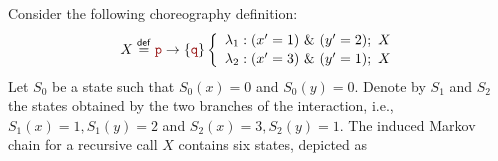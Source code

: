 \begin{example}\label{example2}
  Consider the following choreography definition:
  \begin{displaymath}
    \begin{array}{lll}
      X \stackrel{\mathsf{def}}{=}
      \interactBase{\nr}{\nrr}
      \left\{
      \begin{array}{l}
        \lambda_1 : (x' = 1)\ \&\ (y' = 2);\ X \\[0.5mm]
        \lambda_2 : (x' = 3)\ \&\ (y' = 1);\ X
      \end{array}
      \right.
    \end{array}
  \end{displaymath}
  Let $S_0$ be a state such that $S_0(x)=0$ and $S_0(y)=0$.  Denote by
  $S_1$ and $S_2$ the states obtained by the two branches of the
  interaction, i.e., $S_1(x)=1,S_1(y)=2$ and $S_2(x)=3,S_2(y)=1$.
  The induced Markov chain for a recursive call $X$ contains six
  states, depicted as
  \begin{center}
\end{center}
\end{example}
